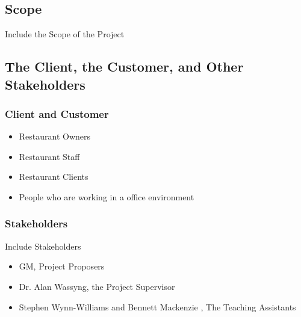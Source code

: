 \documentclass [11pt]{article}
\begin{document}
\subsection{Scope}
Include the Scope of the Project

\subsection{The Client, the Customer, and Other Stakeholders}

\subsubsection{Client and Customer}
	\begin{itemize}
	\item Restaurant Owners
	\item Restaurant Staff
	\item Restaurant Clients
	\item People who are working in a office environment
\end{itemize} 

\subsubsection{Stakeholders}
 Include Stakeholders
		\begin{itemize}
 		\item GM, Project Proposers 
 		\item Dr. Alan Wassyng, the Project Supervisor
 		\item Stephen Wynn-Williams and Bennett Mackenzie , The Teaching Assistants
		\end{itemize} 

\end{document}
